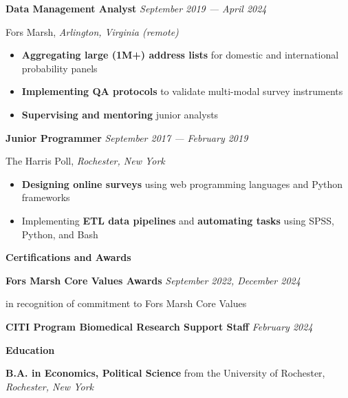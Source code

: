 \documentclass[12pt]{article}
\begin{document}
\textbf{Data Management Analyst} \hfill \textit{September 2019 --- April 2024}
\par Fors Marsh, \textit{Arlington, Virginia (remote)}
\begin{itemize}[]
\item \textbf{Aggregating large (1M+) address lists} for domestic and international probability panels
\item \textbf{Implementing QA protocols} to validate multi-modal survey instruments
\item \textbf{Supervising and mentoring} junior analysts
\end{itemize}

\textbf{Junior Programmer} \hfill \textit{September 2017 --- February 2019}
\par The Harris Poll, \textit{Rochester, New York}
\begin{itemize}[]
\item \textbf{Designing online surveys} using web programming languages and Python frameworks
\item Implementing \textbf{ETL data pipelines} and \textbf{automating tasks} using SPSS, Python, and Bash
\end{itemize}



\vspace{1em}



\textbf{\Large Certifications and Awards} \hrulefill

\vspace{.75em}

\textbf{Fors Marsh Core Values Awards} \hfill \textit{September 2022, December 2024}
\par in recognition of commitment to Fors Marsh Core Values

\vspace{.75em}

\textbf{CITI Program Biomedical Research Support Staff} \hfill \textit{February 2024}



\vspace{1.75em}



\textbf{\Large Education} \hrulefill

\vspace{.75em}

\textbf{B.A. in Economics, Political Science} from the University of Rochester, \textit{Rochester, New York}
\end{document}

